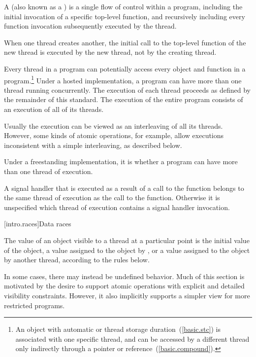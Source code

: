 \pnum
{}%
%
A  (also known as a ) is a single flow of
control within a program, including the initial invocation of a specific
top-level function, and recursively including every function invocation
subsequently executed by the thread. \begin{note} When one thread creates another,
the initial call to the top-level function of the new thread is executed by the
new thread, not by the creating thread. \end{note} Every thread in a program can
potentially access every object and function in a program.\footnote{An object
with automatic or thread storage duration~(\ref{basic.stc}) is associated with
one specific thread, and can be accessed by a different thread only indirectly
through a pointer or reference~(\ref{basic.compound}).} Under a hosted
implementation, a \Cpp program can have more than one thread running
concurrently. The execution of each thread proceeds as defined by the remainder
of this standard. The execution of the entire program consists of an execution
of all of its threads. \begin{note} Usually the execution can be viewed as an
interleaving of all its threads. However, some kinds of atomic operations, for
example, allow executions inconsistent with a simple interleaving, as described
below. \end{note} Under a freestanding implementation, it is  whether a program can
have more than one thread of execution.

\pnum
A signal handler that is executed as a result of a call to the 
function belongs to the same thread of execution as the call to the
 function. Otherwise it is unspecified which thread of execution
contains a signal handler invocation.

[intro.races]{Data races}

\pnum
The value of an object visible to a thread  at a particular point is the
initial value of the object, a value assigned to the object by , or a
value assigned to the object by another thread, according to the rules below.
\begin{note} In some cases, there may instead be undefined behavior. Much of this
section is motivated by the desire to support atomic operations with explicit
and detailed visibility constraints. However, it also implicitly supports a
simpler view for more restricted programs. \end{note}

